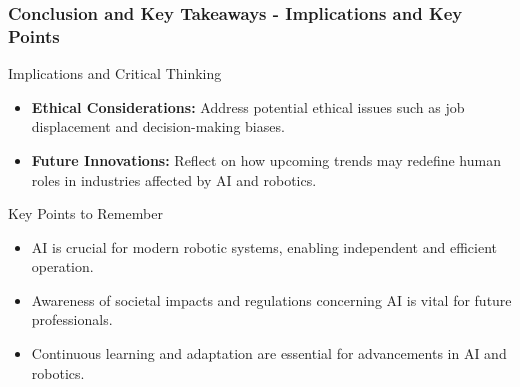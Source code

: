 \documentclass[aspectratio=169]{beamer}
\begin{document}
\begin{frame}[fragile]
    \frametitle{Conclusion and Key Takeaways - Implications and Key Points}

    \begin{block}{Implications and Critical Thinking}
        \begin{itemize}
            \item \textbf{Ethical Considerations:} Address potential ethical issues such as job displacement and decision-making biases.
            \item \textbf{Future Innovations:} Reflect on how upcoming trends may redefine human roles in industries affected by AI and robotics.
        \end{itemize}
    \end{block}

    \begin{block}{Key Points to Remember}
        \begin{itemize}
            \item AI is crucial for modern robotic systems, enabling independent and efficient operation.
            \item Awareness of societal impacts and regulations concerning AI is vital for future professionals.
            \item Continuous learning and adaptation are essential for advancements in AI and robotics.
        \end{itemize}
    \end{block}
\end{frame}
\end{document}
